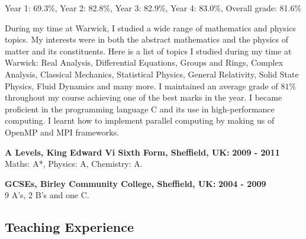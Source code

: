 \documentclass[10pt]{article}
\begin{document}
Year 1: 69.3\%, Year 2: 82.8\%, Year 3: 82.9\%, Year 4: 83.0\%, Overall
grade: 81.6\%

During my time at Warwick, I studied a wide range of mathematics and
physics topics. My interests were in both the abstract mathematics and
the physics of matter and its constituents. Here is a list of topics I
studied during my time at Warwick: Real Analysis, Differential
Equations, Groups and Rings, Complex Analysis, Classical Mechanics,
Statistical Physics, General Relativity, Solid State Physics, Fluid
Dynamics and many more. I maintained an average grade of \(81\%\)
throughout my course achieving one of the best marks in the year. I
became proficient in the programming language C and its use in
high-performance computing. I learnt how to implement parallel computing
by making us of OpenMP and MPI frameworks.

\textbf{A Levels, King Edward Vi Sixth Form, Sheffield, UK:}
\hfill \textbf{ 2009 - 2011 }\\
Maths: A*, Physics: A, Chemistry: A.

\textbf{GCSEs, Birley Community College, Sheffield, UK:}
\hfill \textbf{ 2004 - 2009 }\\
9 A's, 2 B's and one C.

\subsection{Teaching Experience}\label{teaching-experience}
\end{document}

